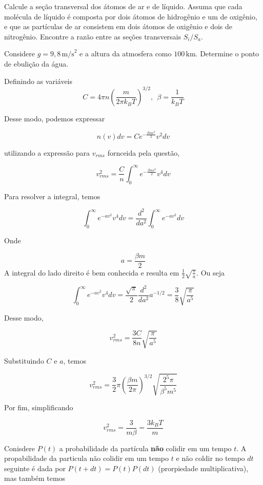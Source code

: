 \documentclass[11pt]{article}
\begin{document}
\begin{pproblem}
\begin{alternativas}
\item Calcule a seção transversal dos átomos de ar e de líquido. Assuma que cada molécula de líquido é composta por dois átomos de hidrogênio e um de oxigênio, e que as partículas de ar consistem em dois átomos de oxigênio e dois de nitrogênio. Encontre a razão entre as seções transversais $S_i/S_a$. 

\item Considere $g = 9,8 \, \text{m/s}^2$ e a altura da atmosfera como $100 \, \text{km}$. Determine o ponto de ebulição da água. 

\end{alternativas}

\begin{pssolution*}{}{}
    \begin{alternativas}
    \item Definindo as variáveis 
    \[C = 4\pi n \left(\frac{m}{2\pi k_B T}\right)^{3/2}, \ \ \beta = \frac{1}{k_BT}\]

    Desse modo, podemos expressar 

    \[n(v)dv = C e^{-\frac{\beta mv^2}{2}}v^2dv\]

    utilizando a expressão para \(v_{rms}\) fornceida pela questão, 

    \[v_{rms}^2 = \frac{C}{n}\int_0^\infty  e^{-\frac{\beta mv^2}{2}}v^4 dv\]

    Para resolver a integral, temos 

    \[\int_0^{\infty} e^{-av^2}v^4 dv = \frac{d^2}{da^2}\int_0^{\infty} e^{-av^2}dv\] 

    Onde 

    \[a = \frac{\beta m}{2}\]
    A integral do lado direito é bem conhecida e resulta em \(\frac{1}{2}\sqrt{\frac{\pi}{a}}\). Ou seja

    \[\int_0^{\infty} e^{-av^2}v^4 dv = \frac{\sqrt{\pi}}{2}\frac{d^2}{da^2}a^{-1/2} = \frac{3}{8}\sqrt{\frac{\pi}{a^5}}\]

    Desse modo, 

    \[v_{rms}^2 = \frac{3C}{8n}\sqrt{\frac{\pi}{a^5}}\]

    Substituindo \(C\) e \(a\), temos 

    \[v_{rms}^2 = \frac{3}{2}\pi  \left(\frac{\beta m}{2\pi}\right)^{3/2}\sqrt{\frac{2^5\pi}{\beta^5m^5}}\]
    
    Por fim, simplificando 

    \[\boxed{v_{rms}^2 = \frac{3}{m\beta} = \frac{3k_B T}{m}}\]

    \item Conisdere \(P(t)\) a probabilidade da partícula \textbf{não} colidir em um tempo \(t\). A propabilidade da particula não colidir em um tempo \(t\) e não coldir no tempo \(dt\) seguinte é dada por \(P(t+dt) = P(t)P(dt)\) (prorpiedade multiplicativa), mas também temos
    

\end{alternativas}
\end{pssolution*}
\end{pproblem}
\end{document}
